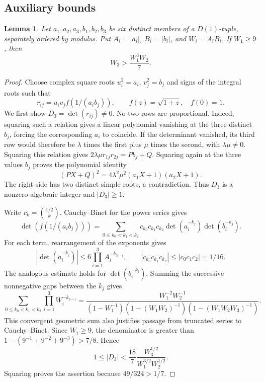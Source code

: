 \documentclass[12pt]{article}
\newtheorem{lemma}[theorem]{Lemma}
\numberwithin{equation}{section}
\begin{document}
\subsection{Auxiliary bounds}

\begin{lemma}\label{sm:crossblock}
Let $a_1,a_2,a_3,b_1,b_2,b_3$ be six distinct members of a
$D(1)$-tuple, separately ordered by modulus. Put
$A_i=|a_i|$, $B_i=|b_i|$, and $W_i=A_iB_i$.
If $W_1\ge9$, then
\[
 W_3>\frac{W_1^3W_2}{7}.
\]
\end{lemma}
\begin{proof}
Choose complex square roots $u_i^2=a_i$, $v_j^2=b_j$ and signs
of the integral roots such that
\[
 r_{ij}=u_iv_j f(1/(a_i b_j)),\qquad f(z)=\sqrt{1+z},\quad f(0)=1.
\]
We first show $D_3=\det(r_{ij})\ne0$. No two rows are proportional. Indeed,
squaring such a relation gives a linear polynomial vanishing at the
three distinct $b_j$, forcing the corresponding $a_i$ to coincide.
If the determinant vanished, its third row would therefore be
$\lambda$ times the first plus $\mu$ times the second, with
$\lambda\mu\ne0$. Squaring this relation gives
$2\lambda\mu r_{1j}r_{2j}=Pb_j+Q$. Squaring again at the three
values $b_j$ proves the polynomial identity
\[
 (PX+Q)^2=4\lambda^2\mu^2(a_1X+1)(a_2X+1).
\]
The right side has two distinct simple roots, a contradiction.
Thus $D_3$ is a nonzero algebraic integer and $|D_3|\ge1$.

Write $c_k=\binom{1/2}{k}$. Cauchy--Binet for the power series gives
\[
 \det(f(1/(a_i b_j)))=
 \sum_{0\le k_0<k_1<k_2}
  c_{k_0}c_{k_1}c_{k_2}
  \det(a_i^{-k_j})\det(b_i^{-k_j}).
\]
For each term, rearrangement of the exponents gives
\[
 |\det(a_i^{-k_j})|\le6\prod_{i=1}^3A_i^{-k_{3-i}},
 \qquad |c_{k_0}c_{k_1}c_{k_2}|\le|c_0c_1c_2|=1/16.
\]
The analogous estimate holds for $\det(b_i^{-k_j})$. Summing the successive
nonnegative gaps between the $k_j$ gives
\[
 \sum_{0\le k_0<k_1<k_2}\prod_{i=1}^3W_i^{-k_{3-i}}
 =\frac{W_1^{-2}W_2^{-1}}
 {(1-W_1^{-1})(1-(W_1W_2)^{-1})(1-(W_1W_2W_3)^{-1})}.
\]
This convergent geometric sum also justifies passage from truncated
series to Cauchy--Binet. Since $W_i\ge9$, the denominator is greater
than $1-(9^{-1}+9^{-2}+9^{-3})>7/8$. Hence
\[
 1\le|D_3|<\frac{18}{7}\frac{W_3^{1/2}}{W_1^{3/2}W_2^{1/2}}.
\]
Squaring proves the assertion because $49/324>1/7$.
\end{proof}
\end{document}
